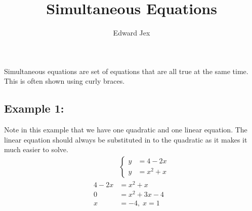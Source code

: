 \documentclass[a4paper,12pt]{article}
\begin{document}
\title{Simultaneous Equations}	
\author{Edward Jex}
\maketitle
Simultaneous equations are set of equations that are all true at the same time. This is often shown using curly braces.
\subsection*{Example 1:}
Note in this example that we have one quadratic and one linear equation. The linear equation should always be substituted in to the quadratic as it makes it much easier to solve. 
\begin{align*}
& 
\begin{cases}
y & = 4 - 2x \\
y & = x^2 + x 
\end{cases}
\\ 
4 - 2x & = x^2 + x 
\\
0 & = x^2 + 3x -4 
\\ 
x & = -4,\;x = 1
\\
\end{align*}
\end{document}
